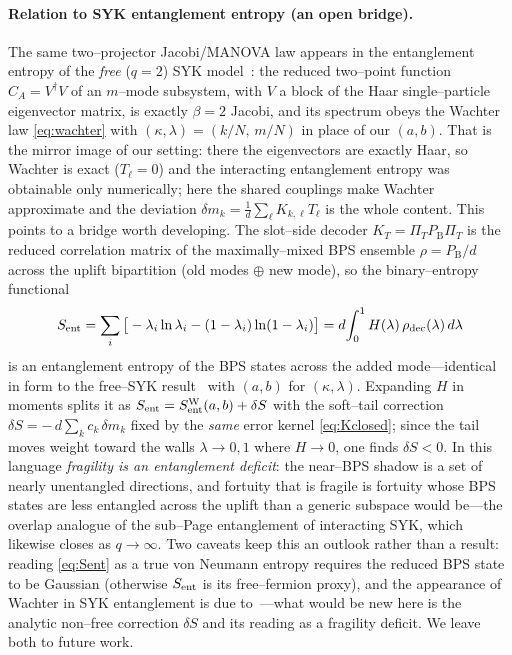 \documentclass[11pt]{article}
\newcommand{\PB}{P_{\mathrm B}}
\newcommand{\PiT}{\Pi_T}
\newcommand{\KT}{K_T}
\begin{document}
\paragraph{Relation to SYK entanglement entropy (an open bridge).}
The same two--projector Jacobi/MANOVA law appears in the entanglement entropy of the \emph{free}
($q{=}2$) SYK model~\cite{LiuChenBalents}: the reduced two--point function $C_A=V^\dagger V$ of an
$m$--mode subsystem, with $V$ a block of the Haar single--particle eigenvector matrix, is exactly
$\beta{=}2$ Jacobi, and its spectrum obeys the Wachter law \eqref{eq:wachter} with $(\kappa,\lambda)=
(k/N,\,m/N)$ in place of our $(a,b)$. That is the mirror image of our setting: there the eigenvectors
are exactly Haar, so Wachter is exact ($T_\ell=0$) and the interacting entanglement entropy was
obtainable only numerically; here the shared couplings make Wachter approximate and the deviation
$\delta m_k=\tfrac1d\sum_\ell K_{k,\ell}T_\ell$ is the whole content. This points to a bridge worth
developing. The slot--side decoder $\KT=\PiT\PB\PiT$ is the reduced correlation matrix of the
maximally--mixed BPS ensemble $\rho=\PB/d$ across the uplift bipartition (old modes $\oplus$ new mode),
so the binary--entropy functional
\begin{equation}
  S_{\rm ent}=\sum_i\big[-\lambda_i\ln\lambda_i-(1-\lambda_i)\ln(1-\lambda_i)\big]
  =d\!\int_0^1 H(\lambda)\,\rho_{\rm dec}(\lambda)\,d\lambda
  \label{eq:Sent}
\end{equation}
is an entanglement entropy of the BPS states across the added mode---identical in form to the free--SYK
result~\cite{LiuChenBalents} with $(a,b)$ for $(\kappa,\lambda)$. Expanding $H$ in moments splits it as
$S_{\rm ent}=S_{\rm ent}^{\rm W}(a,b)+\delta S$ with the soft--tail correction $\delta S=-\,d\sum_k
c_k\,\delta m_k$ fixed by the \emph{same} error kernel \eqref{eq:Kclosed}; since the tail moves weight
toward the walls $\lambda\to0,1$ where $H\to0$, one finds $\delta S<0$. In this language \emph{fragility
is an entanglement deficit}: the near--BPS shadow is a set of nearly unentangled directions, and fortuity
that is fragile is fortuity whose BPS states are less entangled across the uplift than a generic
subspace would be---the overlap analogue of the sub--Page entanglement of interacting SYK, which
likewise closes as $q\to\infty$. Two caveats keep this an outlook rather than a result: reading
\eqref{eq:Sent} as a true von Neumann entropy requires the reduced BPS state to be Gaussian (otherwise
$S_{\rm ent}$ is its free--fermion proxy), and the appearance of Wachter in SYK entanglement is due
to~\cite{LiuChenBalents}---what would be new here is the analytic non--free correction $\delta S$ and
its reading as a fragility deficit. We leave both to future work.
\end{document}
